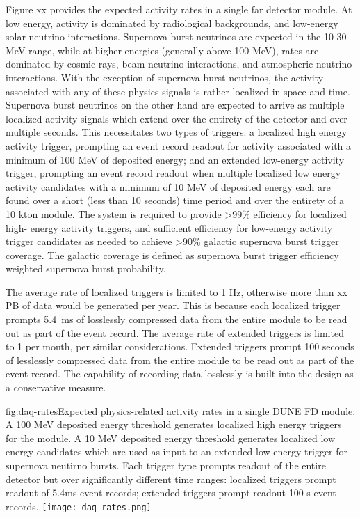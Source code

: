 Figure xx provides the expected activity rates in a single far detector module.
At low energy, activity is dominated by radiological backgrounds, and
low-energy solar neutrino interactions. Supernova burst neutrinos are
expected in the 10-30 MeV range, while at higher energies (generally
above 100 MeV), rates are dominated by cosmic rays, beam neutrino interactions,
and atmospheric neutrino interactions. With the exception of supernova
burst neutrinos, the activity associated with any of these physics
signals is rather localized in space and time. Supernova burst
neutrinos on the other hand are expected to arrive as multiple
localized activity signals which extend over the entirety of the
detector and over multiple seconds. This necessitates two types of
triggers: a localized high energy activity trigger, prompting an event record readout for
activity associated with a minimum of 100 MeV of deposited energy; and an extended
low-energy activity trigger, prompting an event record readout when
multiple localized low energy activity candidates with a minimum of
10 MeV of deposited energy each are found over a short (less than 10
seconds) time period and over the entirety of a 10 kton module. The
system is required to provide >99\% efficiency for localized high-
energy activity triggers, and sufficient efficiency for low-energy
activity trigger candidates as needed to achieve >90\% galactic
supernova burst trigger coverage. The galactic coverage is defined as
supernova burst trigger efficiency weighted supernova burst probability.

The average rate of localized triggers is limited to 1 Hz, otherwise
more than xx PB of data would be generated per year. This is because each localized
trigger prompts 5.4~ms of losslessly compressed data from
the entire module to be read out as part of the event record. The average rate
of extended triggers is limited to 1 per month, per similar
considerations. Extended triggers prompt 100 seconds of lesslessly
compressed data from the entire module to be read out as part of the
event record. The capability of recording data losslessly is built
into the design as a conservative measure. 

\begin{dunefigure}{fig:daq-rates}{Expected physics-related activity
    rates in a single DUNE FD module. A 100 MeV deposited energy
    threshold generates localized high energy triggers for the module.
    A 10 MeV deposited energy threshold generates localized low energy
    candidates which are
    used as input to an extended low energy trigger
    for supernova neutirno bursts. Each trigger type prompts readout
    of the entire detector but over significantly different time
    ranges: localized triggers prompt readout of 5.4ms event records; extended
    triggers prompt readout 100 s event records. \label{sec:fd-daq:rates}
}
  \texttt{[image: daq-rates.png]}
\end{dunefigure}

